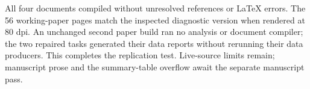 All four documents compiled without unresolved references or LaTeX errors.
The 56 working-paper pages match the inspected diagnostic version when rendered
at 80 dpi. An unchanged second paper build ran no analysis or document compiler;
the two repaired tasks generated their data reports without rerunning their data
producers. This completes the replication test. Live-source limits remain;
manuscript prose and the summary-table overflow await the separate manuscript pass.

